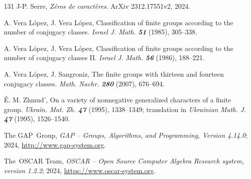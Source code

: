 \documentclass[12pt,leqno,a4paper]{amsart}
\theoremstyle{definition}
\begin{document}
\begin{thebibliography}{131}
{\sc J-P. Serre}, \emph{Z\'eros de caract\`eres}. ArXiv 2312.17551v2, 2024.

{\sc A. Vera L\'opez, J. Vera L\'opez}, Classification of finite groups
  according to the number of conjugacy classes. \emph{Israel J. Math. \bf51}
  (1985), 305--338.

{\sc A. Vera L\'opez, J. Vera L\'opez}, Classification of finite groups
  according to the number of conjugacy classes II. \emph{Israel J. Math. \bf56}
  (1986), 188--221.

{\sc A. Vera L\'opez, J. Sangroniz}, The finite groups with thirteen and
  fourteen conjugacy classes. \emph{Math. Nachr. \bf280} (2007), 676--694.
    
{\sc \'E. M. Zhmud'}, On a variety of nonnegative generalized characters of a
  finite group. \emph{Ukra\"in. Mat. Zh. \bf47} (1995), 1338--1349; translation
  in \emph{Ukrainian Math. J. \bf47} (1995), 1526--1540. 

{\sc The GAP~Group}, {\em GAP -- Groups, Algorithms, and Programming,
  Version 4.14.0}; 2024, \url{http://www.gap-system.org}.

{\sc The~{OSCAR} Team}, \emph{{OSCAR} -- {O}pen {S}ource {C}omputer {A}lgebra
  {R}esearch system, version 1.2.2}; 2024,
  \url{https://www.oscar-system.org}.

\end{thebibliography}

\appendix
\end{document}
